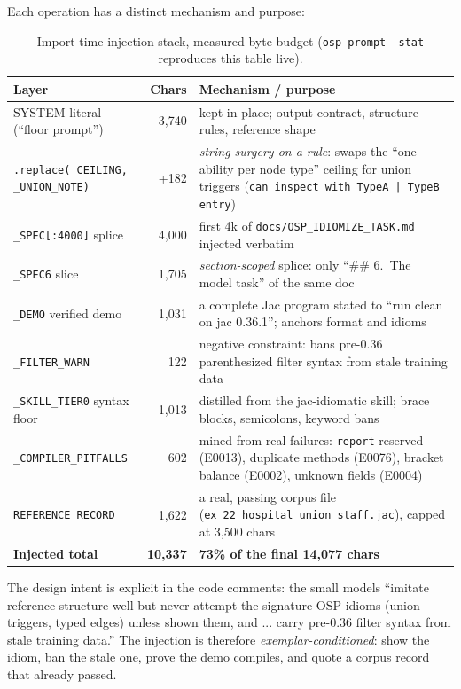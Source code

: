 \documentclass[11pt]{article}
\newcommand{\file}[1]{\texttt{#1}}
\newcommand{\code}[1]{\texttt{#1}}
\begin{document}
Each operation has a distinct mechanism and purpose:

\begin{table}[h]
\centering
\small
\begin{tabular}{@{}p{5.4cm}r p{6.6cm}@{}}
\toprule
\textbf{Layer} & \textbf{Chars} & \textbf{Mechanism / purpose} \\
\midrule
SYSTEM literal (``floor prompt'') & 3{,}740 & kept in place; output contract, structure rules, reference shape \\
\code{.replace(_CEILING, _UNION_NOTE)} & +182 & \emph{string surgery on a rule}: swaps the ``one ability per node type'' ceiling for union triggers (\code{can inspect with TypeA | TypeB entry}) \\
\code{\_SPEC[:4000]} splice & 4{,}000 & first 4k of \file{docs/OSP\_IDIOMIZE\_TASK.md} injected verbatim \\
\code{\_SPEC6} slice & 1{,}705 & \emph{section-scoped} splice: only ``\#\# 6.\ The model task'' of the same doc \\
\code{\_DEMO} verified demo & 1{,}031 & a complete Jac program stated to ``run clean on jac 0.36.1''; anchors format and idioms \\
\code{\_FILTER\_WARN} & 122 & negative constraint: bans pre-0.36 parenthesized filter syntax from stale training data \\
\code{\_SKILL\_TIER0} syntax floor & 1{,}013 & distilled from the jac-idiomatic skill; brace blocks, semicolons, keyword bans \\
\code{\_COMPILER\_PITFALLS} & 602 & mined from real failures: \code{report} reserved (E0013), duplicate methods (E0076), bracket balance (E0002), unknown fields (E0004) \\
\code{REFERENCE RECORD} & 1{,}622 & a real, passing corpus file (\code{ex\_22\_hospital\_union\_staff.jac}), capped at 3{,}500 chars \\
\midrule
\textbf{Injected total} & \textbf{10{,}337} & \textbf{73\% of the final 14{,}077 chars} \\
\bottomrule
\end{tabular}
\caption{Import-time injection stack, measured byte budget (\code{osp prompt
--stat} reproduces this table live).}
\label{tab:layers}
\end{table}

The design intent is explicit in the code comments: the small models ``imitate
reference structure well but never attempt the signature OSP idioms (union
triggers, typed edges) unless shown them, and ... carry pre-0.36 filter syntax
from stale training data.'' The injection is therefore
\emph{exemplar-conditioned}: show the idiom, ban the stale one, prove the demo
compiles, and quote a corpus record that already passed.
\end{document}
